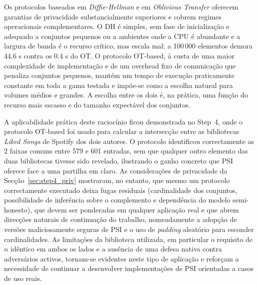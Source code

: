 Os protocolos baseados em \emph{Diffie-Hellman} e em \emph{Oblivious Transfer} oferecem garantias de privacidade substancialmente superiores e cobrem regimes operacionais complementares. O DH é simples, sem fase de inicialização e adequado a conjuntos pequenos ou a ambientes onde a CPU é abundante e a largura de banda é o recurso crítico, mas escala mal: a 100\,000 elementos demora 44.6 s contra os 0.4 s do OT. O protocolo OT-based, à custa de uma maior complexidade de implementação e de um overhead fixo de comunicação que penaliza conjuntos pequenos, mantém um tempo de execução praticamente constante em toda a gama testada e impõe-se como a escolha natural para volumes médios e grandes. A escolha entre os dois é, na prática, uma função do recurso mais escasso e do tamanho expectável dos conjuntos.

A aplicabilidade prática deste raciocínio ficou demonstrada no Step~4, onde o protocolo OT-based foi usado para calcular a intersecção entre as bibliotecas \emph{Liked Songs} de Spotify dos dois autores. O protocolo identificou correctamente as 2 faixas comuns entre 579 e 601 entradas, sem que qualquer outro elemento das duas bibliotecas tivesse sido revelado, ilustrando o ganho concreto que PSI oferece face a uma partilha em claro. As considerações de privacidade da Secção~\ref{sec:step4_priv} mostraram, no entanto, que mesmo um protocolo correctamente executado deixa fugas residuais (cardinalidade dos conjuntos, possibilidade de inferência sobre o complemento e dependência do modelo semi-honesto), que devem ser ponderadas em qualquer aplicação real e que abrem direcções naturais de continuação do trabalho, nomeadamente a adopção de versões maliciosamente seguras de PSI e o uso de \emph{padding} aleatório para esconder cardinalidades. As limitações da biblioteca utilizada, em particular o requisito de $n$ idêntico em ambos os lados e a ausência de uma defesa nativa contra adversários activos, tornam-se evidentes neste tipo de aplicação e reforçam a necessidade de continuar a desenvolver implementações de PSI orientadas a casos de uso reais.
